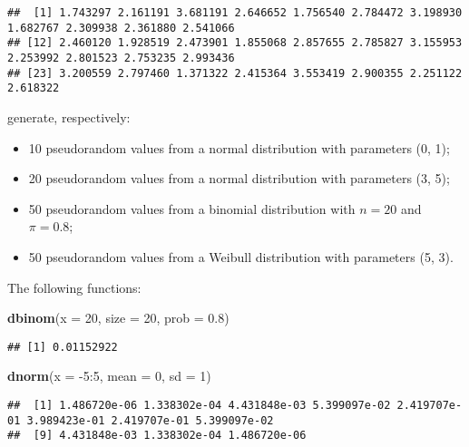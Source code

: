 \documentclass[]{book}
\newenvironment{Shaded}{\begin{snugshade}}{\end{snugshade}}
\newcommand{\KeywordTok}[1]{\textcolor[rgb]{0.13,0.29,0.53}{\textbf{{#1}}}}
\newcommand{\DataTypeTok}[1]{\textcolor[rgb]{0.13,0.29,0.53}{{#1}}}
\newcommand{\DecValTok}[1]{\textcolor[rgb]{0.00,0.00,0.81}{{#1}}}
\newcommand{\FloatTok}[1]{\textcolor[rgb]{0.00,0.00,0.81}{{#1}}}
\newcommand{\NormalTok}[1]{{#1}}
\providecommand{\tightlist}{%
  \setlength{\itemsep}{0pt}\setlength{\parskip}{0pt}}
\def\tightlist{}
\begin{document}
\begin{verbatim}
##  [1] 1.743297 2.161191 3.681191 2.646652 1.756540 2.784472 3.198930 1.682767 2.309938 2.361880 2.541066
## [12] 2.460120 1.928519 2.473901 1.855068 2.857655 2.785827 3.155953 2.253992 2.801523 2.753235 2.993436
## [23] 3.200559 2.797460 1.371322 2.415364 3.553419 2.900355 2.251122 2.618322
\end{verbatim}

generate, respectively:

\begin{itemize}
\tightlist
\item
  10 pseudorandom values from a normal distribution with parameters (0,
  1);
\item
  20 pseudorandom values from a normal distribution with parameters (3,
  5);
\item
  50 pseudorandom values from a binomial distribution with \(n = 20\)
  and \(\pi = 0.8\);
\item
  50 pseudorandom values from a Weibull distribution with parameters (5,
  3).
\end{itemize}

The following functions:

\begin{Shaded}
\begin{Highlighting}[]
\KeywordTok{dbinom}\NormalTok{(}\DataTypeTok{x =} \DecValTok{20}\NormalTok{, }\DataTypeTok{size =} \DecValTok{20}\NormalTok{, }\DataTypeTok{prob =} \FloatTok{0.8}\NormalTok{)}
\end{Highlighting}
\end{Shaded}

\begin{verbatim}
## [1] 0.01152922
\end{verbatim}

\begin{Shaded}
\begin{Highlighting}[]
\KeywordTok{dnorm}\NormalTok{(}\DataTypeTok{x =} \NormalTok{-}\DecValTok{5}\NormalTok{:}\DecValTok{5}\NormalTok{, }\DataTypeTok{mean =} \DecValTok{0}\NormalTok{, }\DataTypeTok{sd =} \DecValTok{1}\NormalTok{)}
\end{Highlighting}
\end{Shaded}

\begin{verbatim}
##  [1] 1.486720e-06 1.338302e-04 4.431848e-03 5.399097e-02 2.419707e-01 3.989423e-01 2.419707e-01 5.399097e-02
##  [9] 4.431848e-03 1.338302e-04 1.486720e-06
\end{verbatim}
\end{document}
